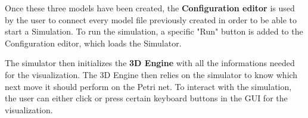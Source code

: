 Once these three models have been created, the \textbf{Configuration editor} is used by the user to connect every model file previously created in order to be able to start a Simulation. 
To run the simulation, a specific "Run" button is added to the Configuration editor, which loads the Simulator.
\newline

The simulator then initializes the \textbf{3D Engine} with all the informations needed for the visualization. The 3D Engine then relies on the simulator to know which next move it should perform on the Petri net. \newline
To interact with the simulation, the user can either click or press certain keyboard buttons in the GUI for the visualization. \newline


